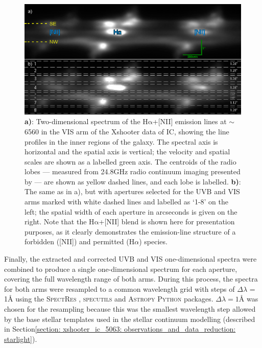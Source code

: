 \begin{figure}[!t]
	\includegraphics[width=\linewidth]{figures/xshooter_ic5063/apertures.png}
	\caption[Two-dimensional long-slit spectra along the radio axis of IC, with the positions of extracted apertures overlaid.]{\textbf{a)}: Two-dimensional spectrum of the H$\mathrm{\alpha}$+[NII] emission lines at $\sim$6560\;{\AA} in the VIS arm of the Xshooter data of IC, showing the line profiles in the inner regions of the galaxy. The spectral axis is horizontal and the spatial axis is vertical; the velocity and spatial scales are shown as a labelled green axis. The centroids of the radio lobes --- measured from 24.8\;GHz radio continuum imaging presented by \citet{Morganti2007} --- are shown as yellow dashed lines, and each lobe is labelled. \textbf{b)}: The same as in a), but with apertures selected for the UVB and VIS arms marked with white dashed lines and labelled as `1-8' on the left; the spatial width of each aperture in arcseconds is given on the right. Note that the H$\mathrm{\alpha}$+[NII] blend is shown here for presentation purposes, as it clearly demonstrates the emission-line structure of a forbidden ([NII]) and permitted (H$\alpha$) species.}
	\label{fig: xshooter_ic5063: apertures}
\end{figure}

Finally, the extracted and corrected UVB and VIS one-dimensional spectra were combined to produce a single one-dimensional spectrum for each aperture, covering the full wavelength range of both arms. During this process, the spectra for both arms were resampled to a common wavelength grid with steps of $\Delta\lambda$ = 1{\;\AA} using the \textsc{SpectRes} \citep{Carnall2017}, \textsc{specutils} \citep{Earl2021} and \textsc{Astropy} \citep{AstropyCollaboration2013, AstropyCollaboration2018} \textsc{Python} packages. $\Delta\lambda = 1${\;\AA} was chosen for the resampling because this was the smallest wavelength step allowed by the base stellar templates used in the stellar continuum modelling (described in Section\;\ref{section: xshooter_ic_5063: observations_and_data_reduction: starlight}). 

